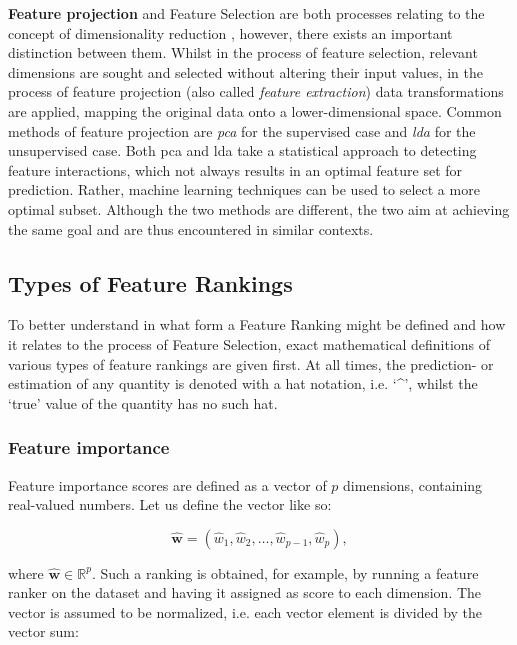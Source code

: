\documentclass[../main.tex]{subfiles}
\begin{document}
\textbf{Feature projection} and Feature Selection are both processes relating to the concept of dimensionality reduction \citep{cunningham_dimension_2007}, however, there exists an important distinction between them. Whilst in the process of feature selection, relevant dimensions are sought and selected without altering their input values, in the process of feature projection (also called \textit{feature extraction}) data transformations are applied, mapping the original data onto a lower-dimensional space. Common methods of feature projection are \textit{\gls{pca}} for the supervised case and \textit{\gls{lda}} for the unsupervised case. Both \gls{pca} and \gls{lda} take a statistical approach to detecting feature interactions, which not always results in an optimal feature set for prediction. Rather, machine learning techniques can be used to select a more optimal subset. Although the two methods are different, the two aim at achieving the same goal and are thus encountered in similar contexts.



\subsection{Types of Feature Rankings}\label{section:methods-ranking-types}
To better understand in what form a Feature Ranking might be defined and how it relates to the process of Feature Selection, exact mathematical definitions of various types of feature rankings are given first. At all times, the prediction- or estimation of any quantity is denoted with a hat notation, i.e. `\textasciicircum', whilst the `true' value of the quantity has no such hat.



\subsubsection{Feature importance}\label{section:feature-importance-definition}
Feature importance scores are defined as a vector of $p$ dimensions, containing real-valued numbers. Let us define the vector like so:

\begin{equation}
\hat{\boldsymbol{w}} = (\hat{w}_1, \hat{w}_2, \ldots, \hat{w}_{p-1}, \hat{w}_p),
\end{equation}

where $\hat{\boldsymbol{w}} \in \mathbb{R}^p$. Such a ranking is obtained, for example, by running a feature ranker on the dataset and having it assigned as score to each dimension. The vector is assumed to be normalized, i.e. each vector element is divided by the vector sum:
\end{document}
